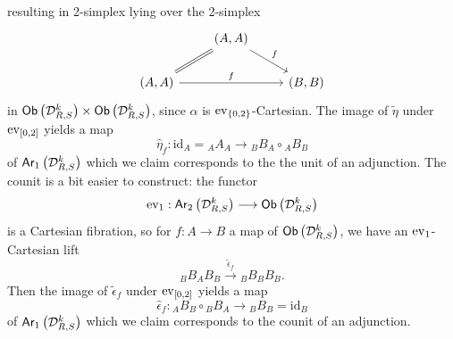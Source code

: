 \documentclass[10pt, reqno, twoside
, final
]{amsart}
\numberwithin{equation}{subsection}%
\theoremstyle{definition}
\theoremstyle{definition}
\theoremstyle{definition}
\theoremstyle{definition}
\theoremstyle{definition}
\theoremstyle{definition}
\theoremstyle{definition}
\theoremstyle{definition}
\theoremstyle{definition}
\theoremstyle{plain}
\theoremstyle{definition}
\theoremstyle{plain}
\theoremstyle{definition}
\theoremstyle{plain}
\theoremstyle{definition}
\theoremstyle{definition}
\theoremstyle{plain}
\theoremstyle{plain}
\theoremstyle{definition}
\theoremstyle{plain}
\theoremstyle{plain}
\theoremstyle{plain}
\begin{document}
resulting in 2-simplex lying over the 2-simplex
\[
\begin{tikzcd}
&  (A,A)\ar[dr,"f"] \\
 (A,A)\ar[rr,"f"] \ar[ur,equal] && (B,B)
\end{tikzcd}
\]
in $\mathsf{Ob}\left(\mathcal{D}^k_{R,S}\right)\times \mathsf{Ob}\left(\mathcal{D}^k_{R,S}\right)$, since $\alpha$ is $\mathrm{ev}_{\{0,2\}}$-Cartesian. The image of $\widetilde{\eta}$ under $\mathrm{ev}_{[0,2]}$ yields a map 
\[ \widehat{\eta}_f: \mathrm{id}_A={}_AA_A \longrightarrow {}_BB_A\circ {}_AB_B\]
of $\mathsf{Ar}_1\left(\mathcal{D}^k_{R,S}\right)$
which we claim corresponds to the the unit of an adjunction. The counit is a bit easier to construct: the functor 
\[  \mathrm{ev}_{1}:\mathsf{Ar}_2\left( \mathcal{D}_{R,S}^k\right)\longrightarrow \mathsf{Ob}\left(\mathcal{D}^k_{R,S}\right) \]
is a Cartesian fibration, so for $f:A\rightarrow B$ a map of $\mathsf{Ob}\left(\mathcal{D}^k_{R,S}\right)$, we have an $\mathrm{ev}_1$-Cartesian lift 
\[  {}_BB_AB_B\overset{\widetilde{\epsilon}_f}{\longrightarrow}{}_BB_BB_B.   \]
Then the image of $\widetilde{\epsilon}_f$ under $\mathrm{ev}_{[0,2]}$ yields a map 
\[ \widehat{\epsilon}_f:{}_AB_B\circ{}_BB_A\longrightarrow {}_BB_B=\mathrm{id}_B  \]
of $\mathsf{Ar}_1\left(\mathcal{D}^k_{R,S}\right)$ which we claim corresponds to the counit of an adjunction. 
\end{document}
